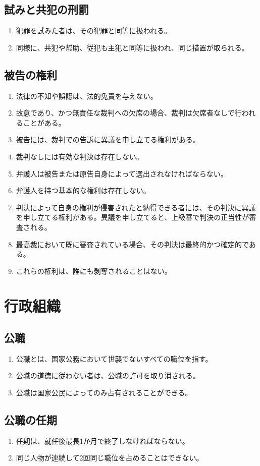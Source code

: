 \documentclass{article}
\begin{document}
\subsection{試みと共犯の刑罰}
\begin{enumerate}
    \item 犯罪を試みた者は、その犯罪と同等に扱われる。
    \item 同様に、共犯や幇助、従犯も主犯と同等に扱われ、同じ措置が取られる。
\end{enumerate}

\subsection{被告の権利}\label{accusation}
\begin{enumerate}
    \item 法律の不知や誤認は、法的免責を与えない。
    \item 故意であり、かつ無責任な裁判への欠席の場合、裁判は欠席者なしで行われることがある。
    \item 被告には、裁判での告訴に異議を申し立てる権利がある。
    \item 裁判なしには有効な判決は存在しない。
    \item 弁護人は被告または原告自身によって選出されなければならない。
    \item 弁護人を持つ基本的な権利は存在しない。
    \item 判決によって自身の権利が侵害されたと納得できる者には、その判決に異議を申し立てる権利がある。異議を申し立てると、上級審で判決の正当性が審査される。
    \item 最高裁において既に審査されている場合、その判決は最終的かつ確定的である。
    \item これらの権利は、誰にも剥奪されることはない。
\end{enumerate}

\newpage
\section{行政組織}
\subsection{公職}
\begin{enumerate}
    \item 公職とは、国家公務において世襲でないすべての職位を指す。
    \item 公職の道徳に従わない者は、公職の許可を取り消される。
    \item 公職は国家公民によってのみ占有されることができる。
\end{enumerate}

\subsection{公職の任期}
\begin{enumerate}
    \item 任期は、就任後最長1か月で終了しなければならない。
    \item 同じ人物が連続して2回同じ職位を占めることはできない。
\end{enumerate}
\end{document}
